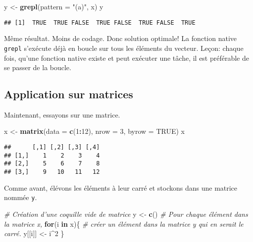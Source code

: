 \documentclass[]{book}
\newenvironment{Shaded}{\begin{snugshade}}{\end{snugshade}}
\newcommand{\KeywordTok}[1]{\textcolor[rgb]{0.13,0.29,0.53}{\textbf{#1}}}
\newcommand{\DataTypeTok}[1]{\textcolor[rgb]{0.13,0.29,0.53}{#1}}
\newcommand{\DecValTok}[1]{\textcolor[rgb]{0.00,0.00,0.81}{#1}}
\newcommand{\StringTok}[1]{\textcolor[rgb]{0.31,0.60,0.02}{#1}}
\newcommand{\CommentTok}[1]{\textcolor[rgb]{0.56,0.35,0.01}{\textit{#1}}}
\newcommand{\OtherTok}[1]{\textcolor[rgb]{0.56,0.35,0.01}{#1}}
\newcommand{\ControlFlowTok}[1]{\textcolor[rgb]{0.13,0.29,0.53}{\textbf{#1}}}
\newcommand{\OperatorTok}[1]{\textcolor[rgb]{0.81,0.36,0.00}{\textbf{#1}}}
\newcommand{\NormalTok}[1]{#1}
\begin{document}
\begin{Shaded}
\begin{Highlighting}[]
\NormalTok{y <-}\StringTok{ }\KeywordTok{grepl}\NormalTok{(}\DataTypeTok{pattern =} \StringTok{"(a)"}\NormalTok{, x)}
\NormalTok{y}
\end{Highlighting}
\end{Shaded}

\begin{verbatim}
## [1]  TRUE  TRUE FALSE  TRUE FALSE  TRUE FALSE  TRUE
\end{verbatim}

Même résultat. Moins de codage. Donc solution optimale! La fonction
native \texttt{grepl} s'exécute déjà en boucle sur tous les éléments du
vecteur. Leçon: chaque fois, qu'une fonction native existe et peut
exécuter une tâche, il est préférable de se passer de la boucle.

\subsection{Application sur matrices}\label{application-sur-matrices}

Maintenant, essayons sur une matrice.

\begin{Shaded}
\begin{Highlighting}[]
\NormalTok{x <-}\StringTok{ }\KeywordTok{matrix}\NormalTok{(}\DataTypeTok{data =} \KeywordTok{c}\NormalTok{(}\DecValTok{1}\OperatorTok{:}\DecValTok{12}\NormalTok{), }\DataTypeTok{nrow =} \DecValTok{3}\NormalTok{, }\DataTypeTok{byrow =} \OtherTok{TRUE}\NormalTok{)}
\NormalTok{x}
\end{Highlighting}
\end{Shaded}

\begin{verbatim}
##      [,1] [,2] [,3] [,4]
## [1,]    1    2    3    4
## [2,]    5    6    7    8
## [3,]    9   10   11   12
\end{verbatim}

Comme avant, élévons les éléments à leur carré et stockons dans une
matrice nommée \texttt{y}.

\begin{Shaded}
\begin{Highlighting}[]
\CommentTok{# Création d'une coquille vide de matrice}
\NormalTok{y <-}\StringTok{ }\KeywordTok{c}\NormalTok{() }
  \CommentTok{# Pour chaque élément dans la matrice x,}
\ControlFlowTok{for}\NormalTok{(i }\ControlFlowTok{in}\NormalTok{ x)\{ }
  \CommentTok{# créer un élément dans la matrice y qui en serait le carré.}
\NormalTok{  y[[i]] <-}\StringTok{ }\NormalTok{i}\OperatorTok{^}\DecValTok{2} 
\NormalTok{\}}
\end{Highlighting}
\end{Shaded}
\end{document}
